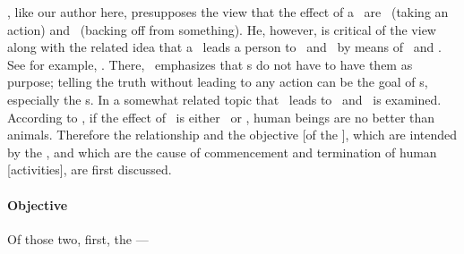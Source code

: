 {\Sankara, like our author here, presupposes the view that the effect of a \sastra\ are \pravrtti\ (taking an action) and \nivrtti\ (backing off from something).  He, however, is critical of the view along with the related idea that a \sastra\ leads a person to \pravrtti\ and \nivrtti\ by means of \vidhi\ and \pratisedha.  See for example,  \citep[particularly pp.~111\,ff., 130\,ff., 137\,ff.]{bsbh}.  There, \Sankara\ emphasizes that \sastra s do not have to have them as purpose; telling the truth without leading to any action can be the goal of \sastra s, especially the \Upanisad s.  In  \citep[41--44]{bsbh} a somewhat related topic that \pramana\ leads to \pravrtti\ and \nivrtti\ is examined.  According to \Sankara, if the effect of \pramana\ is either \pravrtti\ or \nivrtti, human beings are no better than animals.%
}
Therefore the relationship and the
objective [of the \sastra], which are intended by the \Sutrakara, and which are the cause of commencement and termination of human [activities], are first discussed.

\paragraph{Objective}
Of%
 those two, first, the ---

